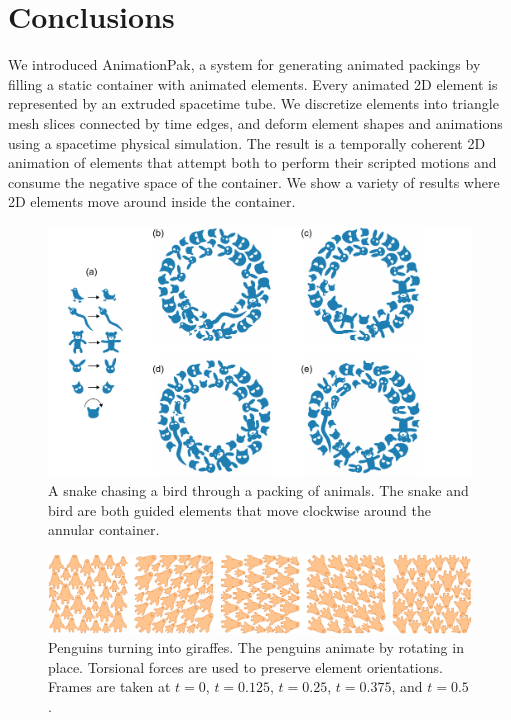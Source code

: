 \section{Conclusions}
\label{animationpak_conclusions}

We introduced AnimationPak, a system for 
generating animated packings by filling a static container with animated
elements.  Every animated 2D element is represented by an extruded 
spacetime tube.
We discretize elements into triangle mesh slices connected by time edges,
and deform element shapes and animations using a spacetime physical
simulation.  The result is a temporally coherent 2D animation of elements
that attempt both to perform their scripted motions and consume the negative
space of the container.
We show a variety of results where
2D elements move around inside the container.




\begin{figure}
\centering
\includegraphics[width=1.0\textwidth]{figures/animationpak/chasing_bird.pdf} 
\caption[An animated packing of a snake chases a bird]
{\label{fig_animationpak_chasing_bird} 
A snake chasing a bird through a packing of animals.  The snake and bird 
	are both guided elements that move clockwise around the annular 
	container.}
\end{figure}

\begin{figure}
\centering
\includegraphics[width=1.0\textwidth]{figures/animationpak/penguin_giraffe.pdf} 
\caption[An animated packing of the penguins-to-giraffes illusion]
{\label{fig_animationpak_penguin_giraffe} 
Penguins turning into giraffes.  The penguins animate by rotating in place.
Torsional forces are used to preserve element orientations.
Frames are taken at $t=0$, $t=0.125$, $t=0.25$, $t=0.375$, and $t=0.5$. 
}
\end{figure}


